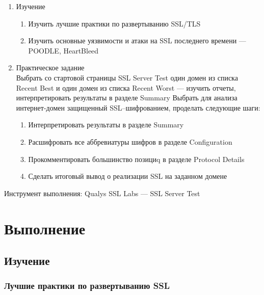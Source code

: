 \documentclass[utf8x, 12pt]{G7-32}
\begin{document}
\begin{enumerate}
	\item Изучение
	\begin{enumerate}
	\item Изучить лучшие практики по развертыванию SSL/TLS
	\item Изучить основные уязвимости и атаки на SSL последнего времени --- POODLE, HeartBleed
\end{enumerate}
	\item Практическое задание\\
	Выбрать со стартовой страницы SSL Server Test один домен из списка Recent Best и один домен из списка Recent Worst --- изучить отчеты, интерпретировать результаты в разделе Summary
Выбрать для анализа интернет-домен защищенный SSL--шифрованием, проделать следующие шаги:
	\begin{enumerate}
	\item Интерпретировать результаты в разделе Summary
	\item Расшифровать все аббревиатуры шифров в разделе Configuration
	\item Прокомментировать большинство позициq в разделе Protocol Details
	\item Сделать итоговый вывод о реализации SSL на заданном домене
	
\end{enumerate}
\end{enumerate}

Инструмент выполнения:
Qualys SSL Labs --- SSL Server Test


\chapter{Выполнение}

\section{Изучение}

\subsection{Лучшие практики по развертыванию SSL}
\end{document}
